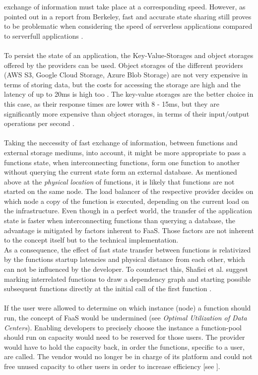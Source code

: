 \documentclass[11pt]{article}
\begin{document}
exchange of information must take place at a corresponding speed. However, as pointed out in a report from Berkeley, fast and accurate state sharing still proves to be problematic when considering the speed of serverless applications compared to serverfull applications \cite{jonas2019cloud}.\\\\ To persist the state of an application, the Key-Value-Storages and object storages offered by the providers can be used. Object storages of the different providers (AWS S3, Google Cloud Storage, Azure Blob Storage) are not very expensive in terms of storing data, but the costs for accessing the storage are high and the latency of up to 20ms is high too \cite{jonas2019cloud}. The key-value storages are the better choice in this case, as their response times are lower with 8 - 15ms, but they are significantly more expensive than object storages, in terms of their input/output operations per second \cite{jonas2019cloud}.\\\\ Taking the neccessity of fast exchange of information, between functions and external storage mediums, into account, it might be more appropriate to pass a functions state, when interconnecting functions, form one function to another without querying the current state form an external database. As mentioned above at the \textit{physical location} of functions, it is likely that functions are not started on the same node. The load balancer of the respective provider decides on which node a copy of the function is executed, depending on the current load on the infrastructure. Even though in a perfect world, the transfer of the application state is faster when interconnecting functions than querying a database, the advantage is mitigated by factors inherent to FaaS. Those factors are not inherent to the concept itself but to the technical implementation.\\ As a consequence, the effect of fast state transfer between functions is relativized by the functions startup latencies and physical distance from each other, which can not be influenced by the developer. To counteract this, Shaﬁei et al. suggest marking interrelated functions to draw a dependency graph and starting possible subsequent functions directly at the initial call of the first function \cite{shafiei2020serverless}.\\\\ If the user were allowed to determine on which instance (node) a function should run, the concept of FaaS would be undermined (see \textit{Optimal Utilization of Data Centers}). Enabling developers to precisely choose the instance a function-pool should run on capacity would need to be reserved for those users. The provider would have to hold the capacity back, in order the functions, specific to a user, are called. The vendor would no longer be in charge of its platform and could not free unused capacity to other users in order to increase efficiency [see \cite{fowler2018serverless}]. 
\end{document}
